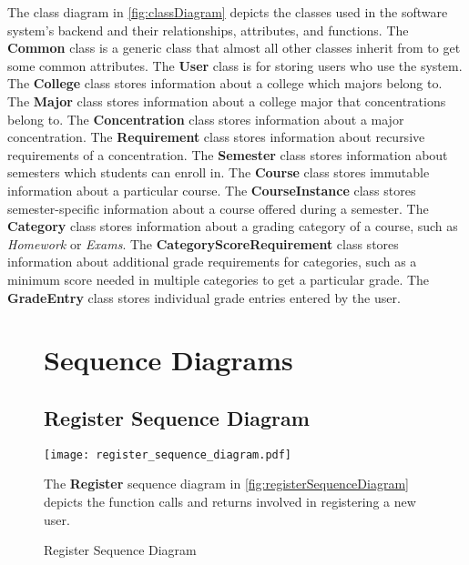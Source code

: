 \documentclass[12pt]{article}
\begin{document}
\clearpage

The class diagram in \autoref{fig:classDiagram} depicts the classes used in the software system's
backend and their relationships, attributes, and functions. The \textbf{Common} class is a generic
class that almost all other classes inherit from to get some common attributes. The \textbf{User}
class is for storing users who use the system. The \textbf{College} class stores information about a
college which majors belong to. The \textbf{Major} class stores information about a college major
that concentrations belong to. The \textbf{Concentration} class stores information about a major
concentration. The \textbf{Requirement} class stores information about recursive requirements of a
concentration. The \textbf{Semester} class stores information about semesters which students can
enroll in. The  \textbf{Course} class stores immutable information about a particular course. The
\textbf{CourseInstance} class stores semester-specific information about a course offered during a
semester. The \textbf{Category} class stores information about a grading category of a course, such
as \emph{Homework} or \emph{Exams}. The \textbf{CategoryScoreRequirement} class stores information
about additional grade requirements for categories, such as a minimum score needed in multiple
categories to get a particular grade. The \textbf{GradeEntry} class stores individual grade entries
entered by the user.

\clearpage

\newcommand{\seqdiades}[3]{
    \begin{justify}
      The \textbf{#1} sequence diagram in \autoref{#2} depicts the function calls and returns
      involved in #3.
    \end{justify}
}

\begin{figure}[p!]
  \section{Sequence Diagrams}
  \subsection{Register Sequence Diagram}
  \centering
  \texttt{[image: register\_sequence\_diagram.pdf]}
  \caption{Register Sequence Diagram}
  \label{fig:registerSequenceDiagram}
  \seqdiades{Register}{fig:registerSequenceDiagram}{registering a new user}
\end{figure}
\end{document}
